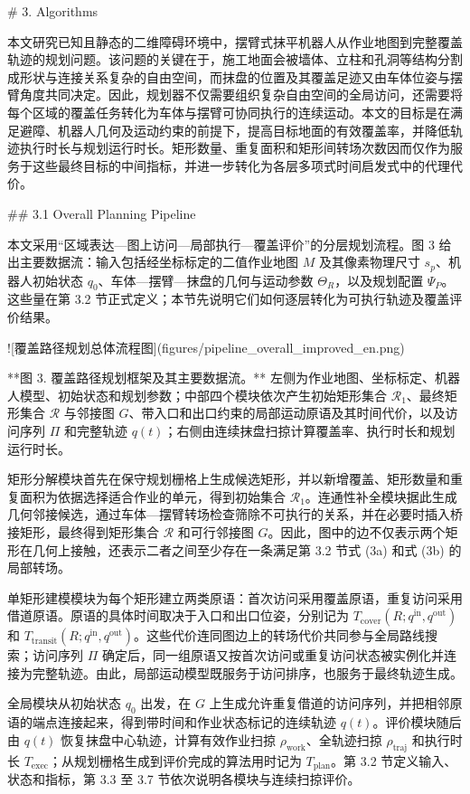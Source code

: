# 3. Algorithms

  

本文研究已知且静态的二维障碍环境中，摆臂式抹平机器人从作业地图到完整覆盖轨迹的规划问题。该问题的关键在于，施工地面会被墙体、立柱和孔洞等结构分割成形状与连接关系复杂的自由空间，而抹盘的位置及其覆盖足迹又由车体位姿与摆臂角度共同决定。因此，规划器不仅需要组织复杂自由空间的全局访问，还需要将每个区域的覆盖任务转化为车体与摆臂可协同执行的连续运动。本文的目标是在满足避障、机器人几何及运动约束的前提下，提高目标地面的有效覆盖率，并降低轨迹执行时长与规划运行时长。矩形数量、重复面积和矩形间转场次数因而仅作为服务于这些最终目标的中间指标，并进一步转化为各层多项式时间启发式中的代理代价。

## 3.1 Overall Planning Pipeline

本文采用“区域表达—图上访问—局部执行—覆盖评价”的分层规划流程。图 3 给出主要数据流：输入包括经坐标标定的二值作业地图 $M$ 及其像素物理尺寸 $s_p$、机器人初始状态 $q_0$、车体—摆臂—抹盘的几何与运动参数 $\Theta_R$，以及规划配置 $\Psi_P$。这些量在第 3.2 节正式定义；本节先说明它们如何逐层转化为可执行轨迹及覆盖评价结果。

![覆盖路径规划总体流程图](figures/pipeline_overall_improved_en.png)

**图 3. 覆盖路径规划框架及其主要数据流。** 左侧为作业地图、坐标标定、机器人模型、初始状态和规划参数；中部四个模块依次产生初始矩形集合 $\mathcal R_1$、最终矩形集合 $\mathcal R$ 与邻接图 $G$、带入口和出口约束的局部运动原语及其时间代价，以及访问序列 $\Pi$ 和完整轨迹 $q(t)$；右侧由连续抹盘扫掠计算覆盖率、执行时长和规划运行时长。

矩形分解模块首先在保守规划栅格上生成候选矩形，并以新增覆盖、矩形数量和重复面积为依据选择适合作业的单元，得到初始集合 $\mathcal R_1$。连通性补全模块据此生成几何邻接候选，通过车体—摆臂转场检查筛除不可执行的关系，并在必要时插入桥接矩形，最终得到矩形集合 $\mathcal R$ 和可行邻接图 $G$。因此，图中的边不仅表示两个矩形在几何上接触，还表示二者之间至少存在一条满足第 3.2 节式 (3a) 和式 (3b) 的局部转场。

  

单矩形建模模块为每个矩形建立两类原语：首次访问采用覆盖原语，重复访问采用借道原语。原语的具体时间取决于入口和出口位姿，分别记为 $T_{\mathrm{cover}}(R;q^{\mathrm{in}},q^{\mathrm{out}})$ 和 $T_{\mathrm{transit}}(R;q^{\mathrm{in}},q^{\mathrm{out}})$。这些代价连同图边上的转场代价共同参与全局路线搜索；访问序列 $\Pi$ 确定后，同一组原语又按首次访问或重复访问状态被实例化并连接为完整轨迹。由此，局部运动模型既服务于访问排序，也服务于最终轨迹生成。

全局模块从初始状态 $q_0$ 出发，在 $G$ 上生成允许重复借道的访问序列，并把相邻原语的端点连接起来，得到带时间和作业状态标记的连续轨迹 $q(t)$。评价模块随后由 $q(t)$ 恢复抹盘中心轨迹，计算有效作业扫掠 $\rho_{\mathrm{work}}$、全轨迹扫掠 $\rho_{\mathrm{traj}}$ 和执行时长 $T_{\mathrm{exec}}$；从规划栅格生成到评价完成的算法用时记为 $T_{\mathrm{plan}}$。第 3.2 节定义输入、状态和指标，第 3.3 至 3.7 节依次说明各模块与连续扫掠评价。

